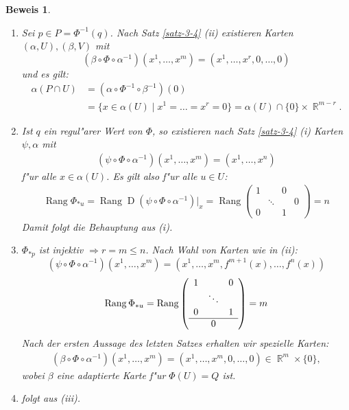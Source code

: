 \documentclass[paper=A4, twoside, chapterprefix=true, bibliography=totoc, headsepline]{scrbook}
\DeclareMathOperator{\R}{\mathbb{R}}
\DeclareMathOperator{\D}{D} %
\DeclareMathOperator{\Rang}{Rang} %
\theoremstyle{plain}
\theoremstyle{nonumberplain}
\newtheorem{bew}{Beweis}
\theoremstyle{empty}
\theoremstyle{break}
\begin{document}
\begin{bew}\begin{enumerate}[label=(\roman*),widest=iii,leftmargin=*]
\item
	Sei $p \in P = \Phi^{-1}(q)$. Nach Satz \ref{satz-3-4} (ii) existieren Karten $(\alpha,U), (\beta, V)$ mit 
		\[ (\beta \circ \Phi \circ \alpha^{-1})(x^1,\ldots,x^m) = (x^1, \ldots,x^r, 0, \ldots, 0) \]
	und es gilt:
	\begin{align*}
		\alpha(P \cap U) & = (\alpha \circ \Phi^{-1} \circ \beta^{-1})(0) \\
		& = \{x \in \alpha (U) \mid x^1 = \ldots = x^r = 0\} = \alpha(U) \cap \{0\} \times \R^{m-r}.
	\end{align*} 
\item
	Ist $q$ ein regul"arer Wert von $\Phi$, so existieren nach Satz \ref{satz-3-4} (i) Karten $\psi, \alpha$ mit 
	\begin{align*}
		(\psi \circ \Phi \circ \alpha^{-1})(x^1, \ldots, x^m) = (x^1, \ldots, x^n) \tag{$m  \geq n = r$}
	\end{align*}
	f"ur alle $x \in \alpha(U)$. Es gilt also f"ur alle $u \in U$:
	\begin{align*}
		\Rang \Phi_{*u} = \Rang \D(\psi \circ \Phi \circ \alpha^{-1})|_x = \Rang
		\left(\begin{array}{ccc|c}
			1 &  & 0 & \\
			& \ddots & & 0 \\
			0 & & 1 & 
		\end{array}\right)
		= n
	\end{align*}
	Damit folgt die Behauptung aus (i).
\item
	$\Phi_{*p}$ ist injektiv $\Rightarrow r = m \leq n$. Nach Wahl von Karten wie in (ii):
		\[ (\psi \circ \Phi \circ \alpha^{-1})(x^1, \ldots, x^m) = (x^1, \ldots, x^m,f^{m+1}(x), \ldots, f^n(x)) \]
		\[\Rang \Phi_{*u} = \Rang 
			\left( \begin{array}{ccc}
				1 & & 0 \\
				& \ddots &  \\
				0 & & 1 \\
				\hline
				& 0      & 
			\end{array} \right)
		= m \]
	Nach der ersten Aussage des letzten Satzes erhalten wir spezielle Karten:
	\begin{align*}
		(\beta \circ \Phi \circ \alpha^{-1})(x^1, \ldots, x^m) = (x^1, \ldots, x^m, 0, \ldots, 0) \in \R^{m} \times \{0\},
	\end{align*}
	wobei $\beta$ eine adaptierte Karte f"ur $\Phi(U) = Q$ ist.
\item
	folgt aus (iii).
\end{enumerate}\end{bew}
\end{document}
